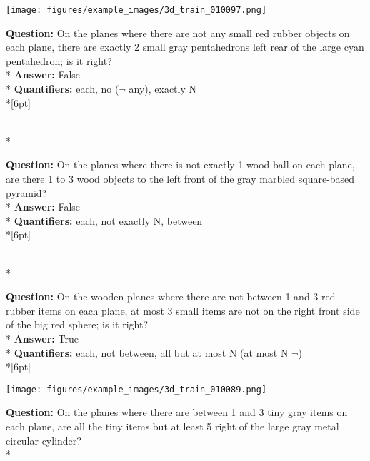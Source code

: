\begin{figure*}
  \begin{minipage}{0.48\textwidth}
    \texttt{[image: figures/example\_images/3d\_train\_010097.png]}
    \begin{minipage}[t][2.2cm][t]{1\textwidth}
      \footnotesize
      \textbf{Question:} On the planes where there are not any small red rubber objects on each plane, there are exactly 2 small gray pentahedrons left rear of the large cyan pentahedron; is it right? \\*
      \textbf{Answer:}  False \\*
      \textbf{Quantifiers:} each, no ($\neg$ any), exactly N \\*[6pt]
    \end{minipage}\\*
    \begin{minipage}[t][2.2cm][t]{1\textwidth}
      \footnotesize
      \textbf{Question:} On the planes where there is not exactly 1 wood ball on each plane, are there 1 to 3 wood objects to the left front of the gray marbled square-based pyramid? \\*
      \textbf{Answer:} False \\*
      \textbf{Quantifiers:} each, not exactly N, between \\*[6pt]
    \end{minipage}\\*
    \begin{minipage}[t][2.2cm][t]{1\textwidth}
      \footnotesize
      \textbf{Question:} On the wooden planes where there are not between 1 and 3 red rubber items on each plane, at most 3 small items are not on the right front side of the big red sphere; is it right? \\*
      \textbf{Answer:} True \\*
      \textbf{Quantifiers:} each, not between, all but at most N (at most N $\neg$)  \\*[6pt]
    \end{minipage}
  \end{minipage}
  \hspace{3.5mm}
  \begin{minipage}{0.48\textwidth}
    \texttt{[image: figures/example\_images/3d\_train\_010089.png]}
    \begin{minipage}[t][2.2cm][t]{1\textwidth}
      \footnotesize
      \textbf{Question:} On the planes where there are between 1 and 3 tiny gray items on each plane, are all the tiny items but at least 5 right of the large gray metal circular cylinder? \\*

\end{minipage}
\end{minipage}
\end{figure*}
